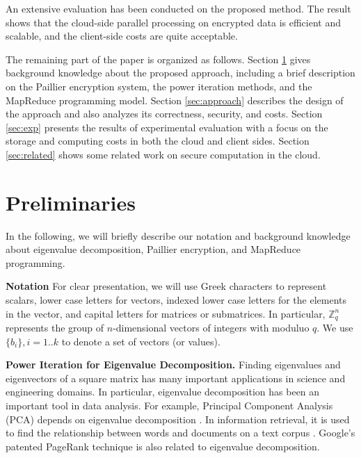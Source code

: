 \documentclass[10pt, conference, compsocconf]{IEEEtran}
\begin{document}
An extensive evaluation has been conducted on the proposed method. The result shows that the cloud-side parallel processing on encrypted data is efficient and scalable, and the client-side costs are quite acceptable. 

The remaining part of the paper is organized as follows. Section \ref{sec:pre} gives background knowledge about the proposed approach, including a brief description on the Paillier encryption system, the power iteration methods, and the MapReduce programming model. Section \ref{sec:approach} describes the design of the approach and also analyzes its correctness, security, and costs. Section \ref{sec:exp} presents the results of experimental evaluation with a focus on the storage and computing costs in both the cloud and client sides. Section \ref{sec:related} shows some related work on secure computation in the cloud.

\section{Preliminaries} \label{sec:pre}


In the following, we will briefly describe our notation and background knowledge about eigenvalue decomposition, Paillier encryption, and MapReduce programming. 

\textbf{Notation}
For clear presentation, we will use Greek characters to represent scalars, lower case letters for vectors, indexed lower case letters for the elements in the vector, and capital letters for matrices or submatrices. In particular, $\mathbb{Z}_q^n$ represents the group of $n$-dimensional vectors of integers with moduluo $q$.
We use $\{b_i\}, i=1..k$ to denote a set of vectors (or values). 



\textbf{Power Iteration for Eigenvalue Decomposition.} Finding eigenvalues and eigenvectors of a square matrix has many important applications in science and engineering domains. In particular, eigenvalue decomposition has been an important tool in data analysis. For example, Principal Component Analysis (PCA) depends on eigenvalue decomposition \cite{jolliffe86}. In information retrieval, it is used to find the relationship between words and documents on a text corpus \cite{deerwester90}. Google's patented PageRank technique\cite{brin98} is also related to eigenvalue decomposition. 
\end{document}

